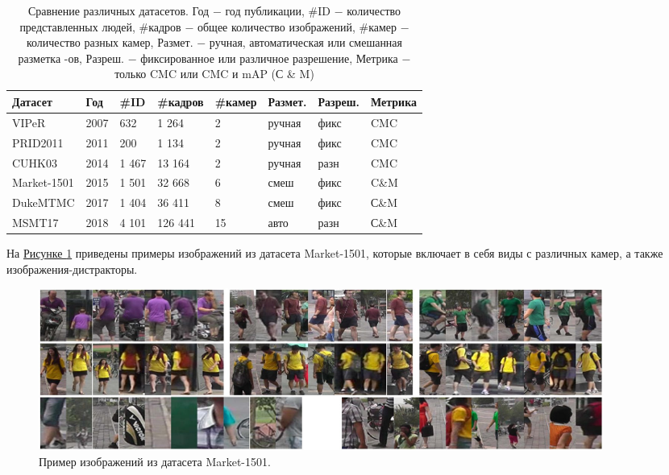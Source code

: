 \begin{table}[]
    \centering
    \caption{Сравнение различных датасетов. Год $-$ год публикации, \#ID $-$ количество представленных людей, \#кадров $-$ общее количество изображений, \#камер $-$ количество разных камер, Размет. $-$ ручная, автоматическая или смешанная разметка \bbox-ов, Разреш. $-$ фиксированное или различное разрешение, Метрика $-$ только CMC или CMC и mAP (С \& M) \cite{ye2021deep}}
    \begin{tabular}{|l|l|l|l|l|l|l|l|}
        \hline
        \multicolumn{1}{|l|}{Датасет} & \multicolumn{1}{l|}{Год} & \multicolumn{1}{l|}{\#ID} & \multicolumn{1}{l|}{\#кадров} & \multicolumn{1}{l|}{\#камер} & \multicolumn{1}{l|}{Размет.} &
        \multicolumn{1}{l|}{Разреш.} & \multicolumn{1}{l|}{Метрика} \\ \hline
        VIPeR & 2007 & 632 & 1 264 & 2 & ручная & фикс & CMC \\ \hline
        PRID2011 & 2011 & 200 & 1 134 & 2 & ручная & фикс & CMC \\ \hline
        CUHK03 & 2014 & 1 467 & 13 164 & 2 & ручная & разн & CMC \\ \hline
        Market-1501 & 2015 & 1 501 & 32 668 & 6 & смеш & фикс & C\&M \\ \hline
        DukeMTMC & 2017 & 1 404 & 36 411 & 8 & смеш & фикс & С\&M \\ \hline
        MSMT17 & 2018 & 4 101 & 126 441 & 15 & авто & разн & С\&M \\ \hline
    \end{tabular}
    \label{tab:datasets}
\end{table}

На  \hyperref[fig:market_example]{Рисунке \ref*{fig:market_example}} приведены примеры изображений из датасета Market-1501, которые включает в себя виды с различных камер, а также изображения-дистракторы.

\begin{figure}[ht]
    \centering
    \includegraphics{images/closed_world/market_example.png}
    \caption{Пример изображений из датасета Market-1501. \cite{zheng2015scalable}}
    \label{fig:market_example}
\end{figure}



\endinput